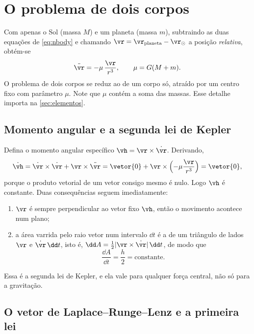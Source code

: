 \section{O problema de dois corpos}\label{sec:doiscorpos}

Com apenas o Sol (massa $M$) e um planeta (massa $m$), subtraindo as duas equações de \eqref{eq:nbody} e chamando $\vr = \vr_\text{planeta}-\vr_\odot$ a posição \emph{relativa}, obtém-se
\begin{equation}
  \ddot{\vr} = -\mu\,\frac{\vr}{r^3},\qquad \mu = G(M+m).
  \label{eq:doiscorpos}
\end{equation}
O problema de dois corpos se reduz ao de um corpo só, atraído por um centro fixo com parâmetro $\mu$. Note que $\mu$ contém a soma das massas. Esse detalhe importa na \autoref{sec:elementos}.

\subsection{Momento angular e a segunda lei de Kepler}

Defina o momento angular específico $\vh = \vr\times\dot{\vr}$. Derivando,
\[
  \dot{\vh} = \dot{\vr}\times\dot{\vr} + \vr\times\ddot{\vr} = \vetor{0} + \vr\times\Bigl(-\mu\frac{\vr}{r^3}\Bigr) = \vetor{0},
\]
porque o produto vetorial de um vetor consigo mesmo é nulo. Logo $\vh$ é constante. Duas consequências seguem imediatamente:

\begin{enumerate}
  \item $\vr$ é sempre perpendicular ao vetor fixo $\vh$, então o movimento acontece num plano;
  \item a área varrida pelo raio vetor num intervalo $\dd t$ é a de um triângulo de lados $\vr$ e $\dot{\vr}\,\dd t$, isto é, $\dd A = \tfrac12|\vr\times\dot{\vr}|\,\dd t$, de modo que
  \begin{equation}
    \frac{\dd A}{\dd t} = \frac{h}{2} = \text{constante}.
    \label{eq:segundalei}
  \end{equation}
\end{enumerate}
Essa é a segunda lei de Kepler, e ela vale para qualquer força central, não só para a gravitação.

\subsection{O vetor de Laplace--Runge--Lenz e a primeira lei}\label{sec:lrl}

